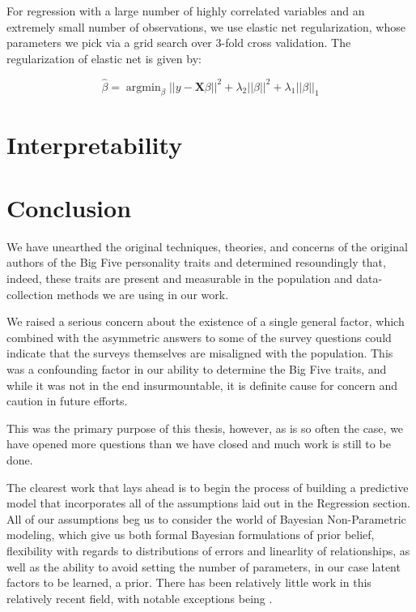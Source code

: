 \documentclass[a4paper,12pt]{article}
\DeclareMathOperator*{\argmin}{argmin}
\begin{document}
For regression with a large number of highly correlated variables and an extremely small number of observations, we use elastic net regularization, whose parameters we pick via a grid search over 3-fold cross validation. The regularization of elastic net is given by:


$$
\hat{\beta} = \argmin_{\beta}||y - \mathbf{X}\beta ||^2 + \lambda_2|| \beta ||^2 + \lambda_1 || \beta ||_1
$$

\section{Interpretability}

\section{Conclusion}

We have unearthed the original techniques, theories, and concerns of the original authors of the Big Five personality traits and determined resoundingly that, indeed, these traits are present and measurable in the population and data-collection methods we are using in our work.

We raised a serious concern about the existence of a single general factor, which combined with the asymmetric answers to some of the survey questions could indicate that the surveys themselves are misaligned with the population. This was a confounding factor in our ability to determine the Big Five traits, and while it was not in the end insurmountable, it is definite cause for concern and caution in future efforts.

This was the primary purpose of this thesis, however, as is so often the case, we have opened more questions than we have closed and much work is still to be done.

The clearest work that lays ahead is to begin the process of building a predictive model that incorporates all of the assumptions laid out in the Regression section. All of our assumptions beg us to consider the world of Bayesian Non-Parametric modeling, which give us both formal Bayesian formulations of prior belief, flexibility with regards to distributions of errors and linearlity of relationships, as well as the ability to avoid setting the number of parameters, in our case latent factors to be learned, a prior. There has been relatively little work in this relatively recent field, with notable exceptions being \cite{}.



\printbibliography
\end{document}
